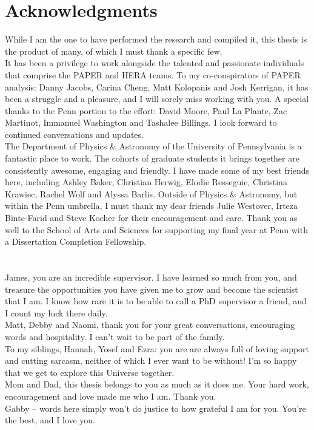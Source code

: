\documentclass[12pt,twoside,openany]{book}
\newcommand{\halfspaced}{\renewcommand{\baselinestretch}{1.5}\normalfont}
\begin{document}
\chapter{Acknowledgments}
{\sloppy
\noindent
While I am the one to have performed the research and compiled it, this thesis is the product of many, of which I must thank a specific few. \\

\noindent
It has been a privilege to work alongside the talented and passionate individuals that comprise the PAPER and HERA teams. To my co-conspirators of PAPER analysis: Danny Jacobs, Carina Cheng, Matt Kolopanis and Josh Kerrigan, it has been a struggle and a pleasure, and I will sorely miss working with you. A special thanks to the Penn portion to the effort: David Moore, Paul La Plante, Zac Martinot, Immanuel Washington and Tashalee Billings. I look forward to continued conversations and updates.\\

\noindent
The Department of Physics \& Astronomy of the University of Pennsylvania is a fantastic place to work. The cohorts of graduate students it brings together are consistently awesome, engaging and friendly. I have made some of my best friends here, including Ashley Baker, Christian Herwig, Elodie Resseguie, Christina Krawiec, Rachel Wolf and Alyssa Barlis. Outside of Physics \& Astronomy, but within the Penn umbrella, I must thank my dear friends Julie Westover, Irteza Binte-Farid and Steve Kocher for their encouragement and care. Thank you as well to the School of Arts and Sciences for supporting my final year at Penn with a Dissertation Completion Fellowship.\\\\\\

\noindent
James, you are an incredible supervisor. I have learned so much from you, and treasure the opportunities you have given me to grow and become the scientist that I am. I know how rare it is to be able to call a PhD supervisor a friend, and I count my luck there daily.\\

\noindent
Matt, Debby and Naomi, thank you for your great conversations, encouraging words and hospitality. I can't wait to be part of the family.\\

\noindent
To my siblings, Hannah, Yosef and Ezra: you are are always full of loving support and cutting sarcasm, neither of which I ever want to be without! I'm so happy that we get to explore this Universe together.\\

\noindent
Mom and Dad, this thesis belongs to you as much as it does me. Your hard work, encouragement and love made me who I am. Thank you.\\

\noindent
Gabby -- words here simply won't do justice to how grateful I am for you. You're the best, and I love you.
}
\end{document}
